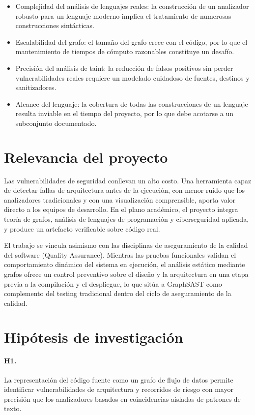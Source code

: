 \begin{itemize}
    \item Complejidad del análisis de lenguajes reales: la construcción de un analizador robusto para un lenguaje moderno implica el tratamiento de numerosas construcciones sintácticas.
    \item Escalabilidad del grafo: el tamaño del grafo crece con el código, por lo que el mantenimiento de tiempos de cómputo razonables constituye un desafío.
    \item Precisión del análisis de taint: la reducción de falsos positivos sin perder vulnerabilidades reales requiere un modelado cuidadoso de fuentes, destinos y sanitizadores.
    \item Alcance del lenguaje: la cobertura de todas las construcciones de un lenguaje resulta inviable en el tiempo del proyecto, por lo que debe acotarse a un subconjunto documentado.
\end{itemize}

\section{Relevancia del proyecto}\label{sec:n1.5}

Las vulnerabilidades de seguridad conllevan un alto costo. Una herramienta capaz de detectar fallas de arquitectura antes de la ejecución, con menor ruido que los analizadores tradicionales y con una visualización comprensible, aporta valor directo a los equipos de desarrollo. En el plano académico, el proyecto integra teoría de grafos, análisis de lenguajes de programación y ciberseguridad aplicada, y produce un artefacto verificable sobre código real.

El trabajo se vincula asimismo con las disciplinas de aseguramiento de la calidad del software (Quality Assurance). Mientras las pruebas funcionales validan el comportamiento dinámico del sistema en ejecución, el análisis estático mediante grafos ofrece un control preventivo sobre el diseño y la arquitectura en una etapa previa a la compilación y el despliegue, lo que sitúa a GraphSAST como complemento del testing tradicional dentro del ciclo de aseguramiento de la calidad.

\section{Hipótesis de investigación}\label{sec:n1.6}

\paragraph{H1.} La representación del código fuente como un grafo de flujo de datos permite identificar vulnerabilidades de arquitectura y recorridos de riesgo con mayor precisión que los analizadores basados en coincidencias aisladas de patrones de texto.

